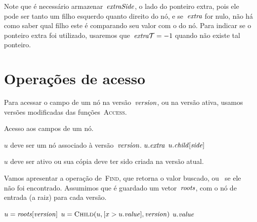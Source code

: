 \documentclass[../../main.tex]{subfiles}
\begin{document}
Note que é necessário armazenar~$\mathit{extraSide}$, o lado do ponteiro extra, pois ele pode ser tanto um filho esquerdo quanto direito do nó, e se~$\mathit{extra}$ for nulo, não há como saber qual filho este é comparando seu valor com o do nó. Para indicar se o ponteiro extra foi utilizado, usaremos que~$\mathit{extra\mathcal{T}} = -1$ quando não existe tal ponteiro.

\section{Operações de acesso} \label{sec:rbacesso}

Para acessar o campo de um nó na versão~$\mathit{version}$, ou na versão ativa, usamos versões modificadas das funções~\textsc{Access}.

\begin{algorithm}
\caption{Acesso aos campos de um nó.}
\begin{algorithmic}[1]

\Require $u$ deve ser um nó associado à versão~$\mathit{version}$.
		\State \Return $u.\mathit{extra}$
	\EndIf
	\State \Return $u.\mathit{child}[\mathit{side}]$
\EndFunction

\Require $u$ deve ser ativo ou sua cópia deve ter sido criada na versão atual.
\State \Return {} 
\EndFunction

\end{algorithmic}
\end{algorithm}

Vamos apresentar a operação de~\textsc{Find}, que retorna o valor buscado, ou~ se ele não foi encontrado. Assumimos que é guardado um vetor~$\mathit{roots}$, com o nó de entrada (a raiz) para cada versão.

\begin{algorithm}
\begin{algorithmic}[1]

	\State $u = \mathit{roots}[\mathit{version}]$
	\State $u = \Call{Child}{u, [x > u.\val], \version}$ \label{line:findrb:iver}
	\EndWhile
		\State \Return \Null
	\Else
		\State \Return $u.\mathit{value}$
	\EndIf
\EndFunction

\end{algorithmic}
\end{algorithm}
\end{document}
